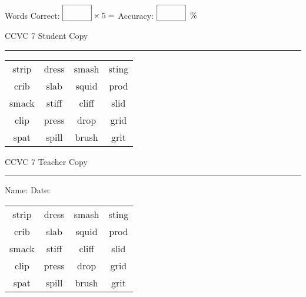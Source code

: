 \documentclass{memoir}
\begin{document}
\normalsize

Words Correct: $\fbox{\phantom{\huge 100}} \times 5 = $ Accuracy: $\fbox{\phantom{\huge 100}}\;\; \%$ 

\vfill

\newpage


\footnotesize \noindent
CCVC 7 \hfill Student Copy
\smallskip
\hrule

\Large

\setlength{\tabcolsep}{14pt}
\def\arraystretch{3}

{\selectfont


\begin{vplace}[0.5]
\begin{center}
\begin{tabular}{cccc}
strip & dress & smash & sting \\
crib & slab             & squid & prod \\
smack & stiff & cliff            & slid \\
clip & press       & drop & grid \\
spat            & spill & brush & grit      \\
\end{tabular}
\end{center}
\end{vplace}

}

\newpage

\footnotesize \noindent
CCVC 7 \hfill Teacher Copy
\smallskip
\hrule

\normalsize

\vfill

\noindent
Name: \underline{\hspace{1.75in}} \hfill Date: \underline{\hspace{1in}}

\Large

{\selectfont


\begin{vplace}[0.5]
\begin{center}
\begin{tabular}{cccc}
strip & dress & smash & sting \\
crib & slab             & squid & prod \\
smack & stiff & cliff            & slid \\
clip & press       & drop & grid \\
spat            & spill & brush & grit      \\
\end{tabular}
\end{center}
\end{vplace}



}
\end{document}
